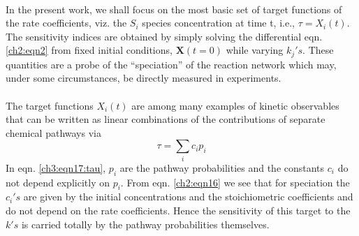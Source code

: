 \paragraph{}
In the present work, we shall focus on the most basic set of
target functions of the rate coefficients, viz. the $S_i$ species
concentration at time t, i.e., $\tau=X_i(t)$. The sensitivity indices are
obtained by simply solving the differential eqn. \ref{ch2:eqn2} from fixed
initial conditions, $\mathbf{X}(t=0)$ while varying ${k_j}'s$. These quantities are
a probe of the “speciation” of the reaction network which may,
under some circumstances, be directly measured in experiments.
\newline
\paragraph{}
The target functions $X_i(t)$ are among many examples of
kinetic observables that can be written as linear combinations of
the contributions of separate chemical pathways via
\begin{equation}
\label{ch3:eqn17:tau}
\tau = \sum_{i}{c_ip_i}
\end{equation}
In eqn. \ref{ch3:eqn17:tau}, $p_i$ are the pathway probabilities and the constants
$c_i$ do not depend explicitly on $p_i$. From eqn. \ref{ch2:eqn16} we see that for speciation the ${c_i}'s$ are given by the initial concentrations and the
stoichiometric coefficients and do not depend on the rate
coefficients. Hence the sensitivity of this target to the $k's$ is
carried totally by the pathway probabilities themselves.

